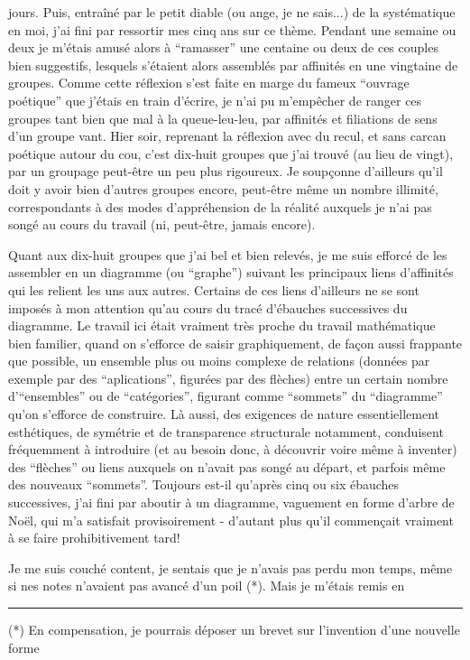 jours. Puis, entraîné par le petit diable (ou ange, je ne sais...) de la systématique en moi, j'ai fini par ressortir mes  cinq ans sur ce thème. Pendant une semaine ou deux je m'étais amusé alors à ``ramasser'' une centaine ou deux de ces couples bien suggestifs, lesquels s'étaient alors assemblés par affinités en une vingtaine de groupes. Comme cette réflexion s'est faite en marge du fameux ``ouvrage poétique'' que j'étais en train d'écrire, je n'ai pu m'empêcher de ranger ces groupes tant bien que mal à la queue-leu-leu, par affinités et filiations de sens d'un groupe vant. Hier soir, reprenant la réflexion avec du recul, et sans carcan poétique autour du cou, c'est dix-huit groupes que j'ai trouvé (au lieu de vingt), par un groupage peut-être un peu plus rigoureux. Je soupçonne d'ailleurs qu'il doit y avoir bien d'autres groupes encore, peut-être même un nombre illimité, correspondants à des modes d'appréhension de la réalité auxquels je n'ai pas songé au cours du travail (ni, peut-être, jamais encore).

Quant aux dix-huit groupes que j'ai bel et bien relevés, je me suis efforcé de les assembler en un diagramme (ou ``graphe'') suivant les principaux liens d'affinités qui les relient les uns aux autres. Certains de ces liens d'ailleurs ne se sont imposés à mon attention qu'au cours du tracé d'ébauches successives du diagramme. Le travail ici était vraiment très proche du travail mathématique bien familier, quand on s'efforce de saisir graphiquement, de façon aussi frappante que possible, un ensemble plus ou moins complexe de relations (données par exemple par des ``aplications'', figurées par des flèches) entre un certain nombre d'``ensembles'' ou de ``catégories'', figurant comme ``sommets'' du ``diagramme'' qu'on s'efforce de construire. Là aussi, des exigences de nature essentiellement esthétiques, de symétrie et de transparence structurale notamment, conduisent fréquemment à introduire (et au besoin donc, à découvrir voire même à inventer) des ``flèches'' ou liens auxquels on n'avait pas songé au départ, et parfois même des nouveaux ``sommets''. Toujours est-il qu'après cinq ou six ébauches successives, j'ai fini par aboutir à un diagramme, vaguement en forme d'arbre de Noël, qui m'a satisfait provisoirement - d'autant plus qu'il commençait vraiment à se faire prohibitivement tard!

Je me suis couché content, je sentais que je n'avais pas perdu mon temps, même si nes notes n'avaient pas avancé d'un poil (*). Mais je m'étais remis en

\noindent\rule{3cm}{.35pt}

{\small (*) En compensation, je pourrais déposer un brevet sur l'invention d'une nouvelle forme }

